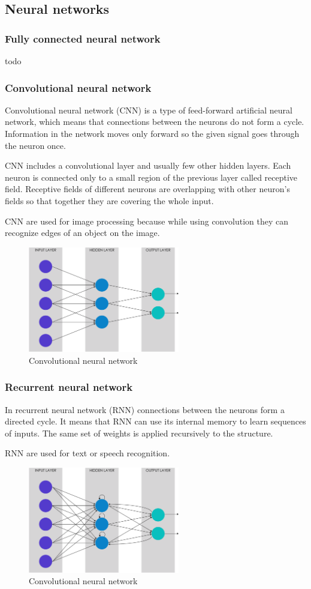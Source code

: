 \subsection{Neural networks}
\subsubsection{Fully connected neural network}
todo
\subsubsection{Convolutional neural network}
Convolutional neural network (CNN) is a type of feed-forward artificial neural network, which means that connections between the neurons do not form a cycle. Information in the network moves only forward so the given signal goes through the neuron once.
\par CNN includes a convolutional layer and usually few other hidden layers. Each neuron is connected only to a small region of the previous layer called receptive field. Receptive fields of different neurons are overlapping with other neuron's fields so that together they are covering the whole input.
\par CNN are used for image processing because while using convolution they can recognize edges of an object on the image.
\begin{figure}[H]
\centering
\includegraphics[width=250px]{pictures/cnn.png}
\caption{Convolutional neural network}
\end{figure}

\subsubsection{Recurrent neural network}
In recurrent neural network (RNN) connections between the neurons form a directed cycle. It means that RNN can use its internal memory to learn  sequences of inputs. The same set of weights is applied recursively to the structure.
\par RNN are used for text or speech recognition.
\begin{figure}[H]
\centering
\includegraphics[width=250px]{pictures/rnn.png}
\caption{Convolutional neural network}
\end{figure}


